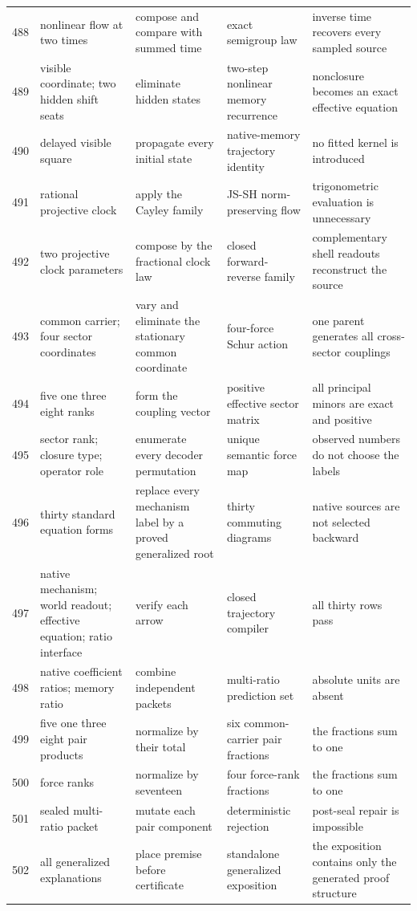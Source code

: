 \documentclass[11pt]{article}
\numberwithin{equation}{section}
\theoremstyle{remark}
\begin{document}
\begin{landscape}
\begin{longtable}{p{0.65cm}p{3.5cm}p{4.0cm}p{4.0cm}p{4.6cm}}
488&nonlinear flow at two times&compose and compare with summed time&exact semigroup law&inverse time recovers every sampled source\\
489&visible coordinate; two hidden shift seats&eliminate hidden states&two-step nonlinear memory recurrence&nonclosure becomes an exact effective equation\\
490&delayed visible square&propagate every initial state&native-memory trajectory identity&no fitted kernel is introduced\\
491&rational projective clock&apply the Cayley family&JS-SH norm-preserving flow&trigonometric evaluation is unnecessary\\
492&two projective clock parameters&compose by the fractional clock law&closed forward-reverse family&complementary shell readouts reconstruct the source\\
493&common carrier; four sector coordinates&vary and eliminate the stationary common coordinate&four-force Schur action&one parent generates all cross-sector couplings\\
494&five one three eight ranks&form the coupling vector&positive effective sector matrix&all principal minors are exact and positive\\
495&sector rank; closure type; operator role&enumerate every decoder permutation&unique semantic force map&observed numbers do not choose the labels\\
496&thirty standard equation forms&replace every mechanism label by a proved generalized root&thirty commuting diagrams&native sources are not selected backward\\
497&native mechanism; world readout; effective equation; ratio interface&verify each arrow&closed trajectory compiler&all thirty rows pass\\
498&native coefficient ratios; memory ratio&combine independent packets&multi-ratio prediction set&absolute units are absent\\
499&five one three eight pair products&normalize by their total&six common-carrier pair fractions&the fractions sum to one\\
500&force ranks&normalize by seventeen&four force-rank fractions&the fractions sum to one\\
501&sealed multi-ratio packet&mutate each pair component&deterministic rejection&post-seal repair is impossible\\
502&all generalized explanations&place premise before certificate&standalone generalized exposition&the exposition contains only the generated proof structure\\

\end{longtable}
\end{landscape}
\end{document}
